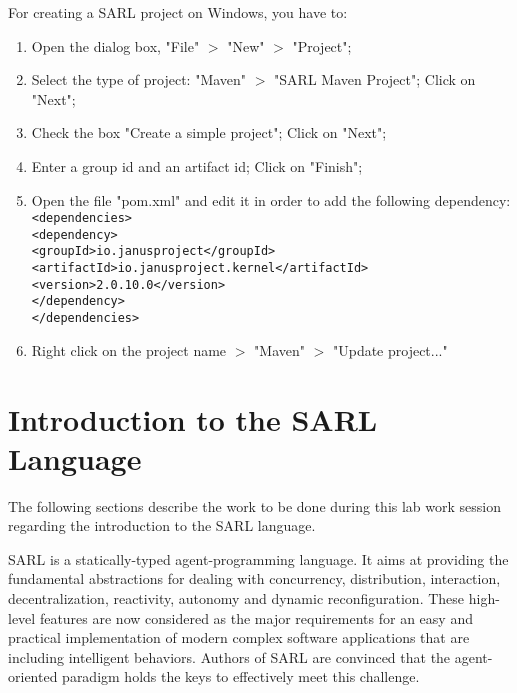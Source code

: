 \documentclass[article,english,nodocumentinfo]{utbmciadreport}
\begin{document}
For creating a SARL project on Windows, you have to:
\begin{enumerate}
\item Open the dialog box, "File" $>$ "New" $>$ "Project";
\item Select the type of project: "Maven" $>$ "SARL Maven Project"; Click on "Next";
\item Check the box "Create a simple project"; Click on "Next";
\item Enter a group id and an artifact id; Click on "Finish";
\item Open the file "pom.xml" and edit it in order to add the following dependency:
\texttt{\string<dependencies\string>}\\
\texttt{\string<dependency\string>}\\
\texttt{\string<groupId\string>io.janusproject\string</groupId\string>}\\
\texttt{\string<artifactId\string>io.janusproject.kernel\string</artifactId\string>}\\
\texttt{\string<version\string>2.0.10.0\string</version\string>}\\
\texttt{\string</dependency\string>}\\
\texttt{\string</dependencies\string>}
\item Right click on the project name $>$ "Maven" $>$ "Update project..."
\end{enumerate}

\section{Introduction to the SARL Language}

The following sections describe the work to be done during this lab work session regarding the introduction to the SARL language.

SARL is a statically-typed agent-programming language.
It aims at providing the fundamental abstractions for dealing with concurrency, distribution, interaction, decentralization, reactivity, autonomy and dynamic reconfiguration.
These high-level features are now considered as the major requirements for an easy and practical implementation of modern complex software applications that are including intelligent behaviors.
Authors of SARL are convinced that the agent-oriented paradigm holds the keys to effectively meet this challenge.
\end{document}
